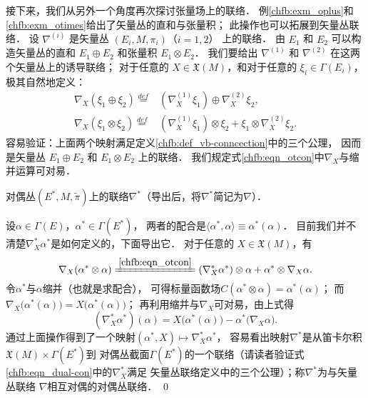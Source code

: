 接下来，我们从另外一个角度再次探讨张量场上的联络．
例\ref{chfb:exm_oplus}和\ref{chfb:exm_otimes}给出了矢量丛的直和与张量积；
此操作也可以拓展到矢量丛联络．
设 $\nabla^{(i)}$ 是矢量丛 $(E_i, M,\pi_i)$（$i=1,2$） 上的联络． 
由 $E_1$ 和 $E_2$ 可以构造矢量丛的直和 $E_1 \oplus E_2$ 和张量积 $E_1 \otimes E_2$．
我们要给出 $\nabla^{(1)}$ 和 $\nabla^{(2)}$ 在这两个矢量丛上的诱导联络；
对于任意的 $X \in \mathfrak{X}(M)$，和对于任意的 $\xi_i \in \Gamma(E_i)$，
极其自然地定义：
\begin{align}
    \nabla_X\left(\xi_1 \oplus \xi_2\right)\overset{def}{=}&
    \left(\nabla_X^{(1)} \xi_1\right) \oplus \nabla_X^{(2)} \xi_2, \label{chfb:eqn_opcon} \\
    \nabla_X\left(\xi_1 \otimes \xi_2\right)\overset{def}{=}& \left(\nabla_X^{(1)} \xi_1\right) \otimes 
    \xi_2+\xi_1 \otimes \nabla_X^{(2)} \xi_2 . \label{chfb:eqn_otcon}
\end{align}
容易验证：上面两个映射满足定义\ref{chfb:def_vb-conncection}中的三个公理，
因而是矢量丛 $E_1 \oplus E_2$ 和 $E_1 \otimes E_2$ 上的联络．
我们规定式\eqref{chfb:eqn_otcon}中$\nabla_X$与缩并运算可对易．


\begin{example}
    对偶丛$(E^*,M,\tilde{\pi})$上的联络$\nabla^*$（导出后，将$\nabla^*$简记为$\nabla$）．
\end{example}
设$\alpha \in \Gamma(E)$，$\alpha^*\in \Gamma(E^*)$，
两者的配合是$\langle \alpha^*, \alpha \rangle \equiv \alpha^*(\alpha)$．
目前我们并不清楚$\nabla_X^* \alpha^*$是如何定义的，下面导出它．
对于任意的 $X \in \mathfrak{X}(M)$，有
\begin{equation*}
    \nabla_X( \alpha^* \otimes \alpha )\xlongequal{\ref{chfb:eqn_otcon}}
    (\nabla_X^* \alpha^*)\otimes \alpha + \alpha^* \otimes \nabla_X \alpha .
\end{equation*}
令$\alpha^*$与$\alpha$缩并（也就是求配合），
可得标量函数场$C(\alpha^* \otimes \alpha)=\alpha^*(\alpha)$；
而$\nabla_X\bigl( \alpha^*(\alpha) \bigr)=X \bigl( \alpha^*(\alpha) \bigr)$；
再利用缩并与$\nabla_X$可对易，由上式得
\begin{equation}\label{chfb:eqn_dual-con}
    (\nabla_X^* \alpha^* )(\alpha)=X\bigl(\alpha^*(\alpha)\bigr)-\alpha^*\bigl(\nabla_X \alpha\bigr).
\end{equation}
通过上面操作得到了一个映射$(\alpha^*, X) \mapsto \nabla_X^* \alpha^*$，
容易看出映射$\nabla^*$是从笛卡尔积$\mathfrak{X}(M)\times \Gamma(E^*)$到
对偶丛截面$\Gamma (E^*)$的一个联络（请读者验证式\eqref{chfb:eqn_dual-con}中的$\nabla_X^*$满足
矢量丛联络定义中的三个公理）；称$\nabla^*$为与矢量丛联络 $\nabla$相互对偶的对偶丛联络．
\qed



